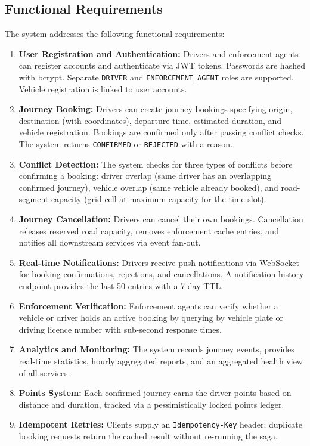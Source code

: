 \documentclass[12pt,a4paper]{article}
\begin{document}
\subsection{Functional Requirements}
 
The system addresses the following functional requirements:
 
\begin{enumerate}[label=\textbf{FR\arabic*}]
    \item \textbf{User Registration and Authentication:} Drivers and enforcement agents can register accounts and authenticate via JWT tokens. Passwords are hashed with bcrypt. Separate \texttt{DRIVER} and \texttt{ENFORCEMENT\_AGENT} roles are supported. Vehicle registration is linked to user accounts.
    \item \textbf{Journey Booking:} Drivers can create journey bookings specifying origin, destination (with coordinates), departure time, estimated duration, and vehicle registration. Bookings are confirmed only after passing conflict checks. The system returns \texttt{CONFIRMED} or \texttt{REJECTED} with a reason.
    \item \textbf{Conflict Detection:} The system checks for three types of conflicts before confirming a booking: driver overlap (same driver has an overlapping confirmed journey), vehicle overlap (same vehicle already booked), and road-segment capacity (grid cell at maximum capacity for the time slot).
    \item \textbf{Journey Cancellation:} Drivers can cancel their own bookings. Cancellation releases reserved road capacity, removes enforcement cache entries, and notifies all downstream services via event fan-out.
    \item \textbf{Real-time Notifications:} Drivers receive push notifications via WebSocket for booking confirmations, rejections, and cancellations. A notification history endpoint provides the last 50 entries with a 7-day TTL.
    \item \textbf{Enforcement Verification:} Enforcement agents can verify whether a vehicle or driver holds an active booking by querying by vehicle plate or driving licence number with sub-second response times.
    \item \textbf{Analytics and Monitoring:} The system records journey events, provides real-time statistics, hourly aggregated reports, and an aggregated health view of all services.
    \item \textbf{Points System:} Each confirmed journey earns the driver points based on distance and duration, tracked via a pessimistically locked points ledger.
    \item \textbf{Idempotent Retries:} Clients supply an \texttt{Idempotency-Key} header; duplicate booking requests return the cached result without re-running the saga.
\end{enumerate}
 
\end{document}
